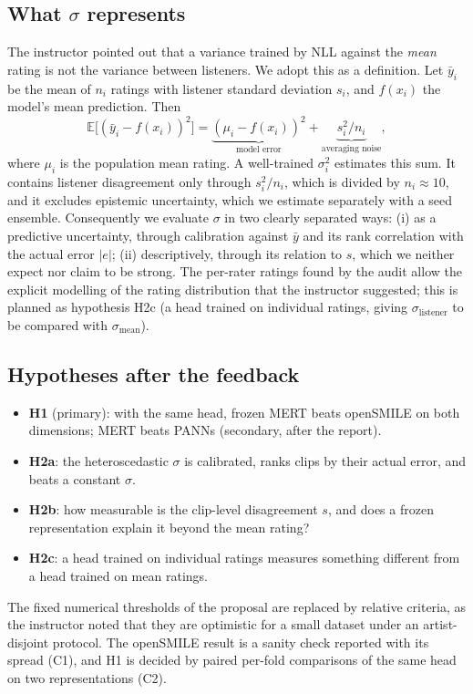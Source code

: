 \documentclass[conference]{IEEEtran}
\begin{document}
\subsection{What $\sigma$ represents}
\label{sec:sigma}
The instructor pointed out that a variance trained by NLL against the
\emph{mean} rating is not the variance between listeners. We adopt this as a
definition. Let $\bar y_i$ be the mean of $n_i$ ratings with listener standard
deviation $s_i$, and $f(x_i)$ the model's mean prediction. Then
\begin{equation}
\mathbb{E}\big[(\bar y_i - f(x_i))^2\big] =
\underbrace{(\mu_i - f(x_i))^2}_{\text{model error}} +
\underbrace{s_i^2/n_i}_{\text{averaging noise}},
\label{eq:sigma}
\end{equation}
where $\mu_i$ is the population mean rating. A well-trained $\sigma_i^2$
estimates this sum. It contains listener disagreement only through
$s_i^2/n_i$, which is divided by $n_i\approx10$, and it excludes epistemic
uncertainty, which we estimate separately with a seed ensemble. Consequently
we evaluate $\sigma$ in two clearly separated ways: (i) as a predictive
uncertainty, through calibration against $\bar y$ and its rank correlation
with the actual error $|e|$; (ii) descriptively, through its relation to $s$,
which we neither expect nor claim to be strong. The per-rater ratings found
by the audit allow the explicit modelling of the rating distribution that the
instructor suggested; this is planned as hypothesis H2c (a head trained on
individual ratings, giving $\sigma_{\text{listener}}$ to be compared with
$\sigma_{\text{mean}}$).

\subsection{Hypotheses after the feedback}
\begin{itemize}
\item \textbf{H1} (primary): with the same head, frozen MERT beats openSMILE on
both dimensions; MERT beats PANNs (secondary, after the report).
\item \textbf{H2a}: the heteroscedastic $\sigma$ is calibrated, ranks clips by
their actual error, and beats a constant $\sigma$.
\item \textbf{H2b}: how measurable is the clip-level disagreement $s$, and
does a frozen representation explain it beyond the mean rating?
\item \textbf{H2c}: a head trained on individual ratings measures something
different from a head trained on mean ratings.
\end{itemize}
The fixed numerical thresholds of the proposal are replaced by relative
criteria, as the instructor noted that they are optimistic for a small
dataset under an artist-disjoint protocol. The openSMILE result is a sanity
check reported with its spread (C1), and H1 is decided by paired per-fold
comparisons of the same head on two representations (C2).
\end{document}
